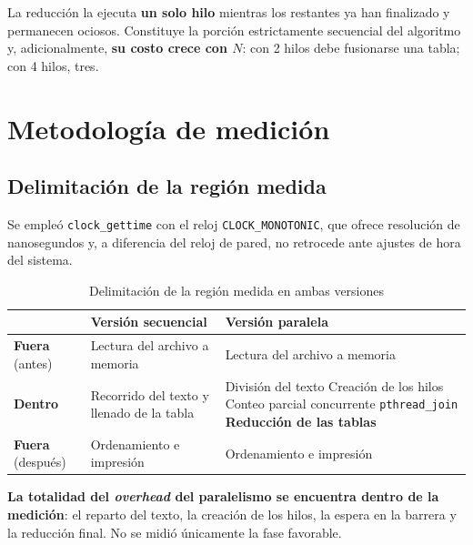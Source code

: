 \documentclass[11pt,letterpaper]{article}
\newcommand{\destacado}[2][azulcl]{%
  \begin{cajadest}[#1]\small #2\end{cajadest}}
\begin{document}
La reducción la ejecuta \textbf{un solo hilo} mientras los restantes ya han
finalizado y permanecen ociosos. Constituye la porción estrictamente secuencial
del algoritmo y, adicionalmente, \textbf{su costo crece con $N$}: con 2 hilos debe
fusionarse una tabla; con 4 hilos, tres.

\section{Metodología de medición}

\subsection{Delimitación de la región medida}
\label{sec:region}

Se empleó \texttt{clock\_gettime} con el reloj \texttt{CLOCK\_MONOTONIC}, que
ofrece resolución de nanosegundos y, a diferencia del reloj de pared, no
retrocede ante ajustes de hora del sistema.

\begin{table}[H]
\centering
\caption{Delimitación de la región medida en ambas versiones}
\small
\begin{tabular}{@{}p{3.2cm}p{5.3cm}p{5.8cm}@{}}
\toprule
 & \textbf{Versión secuencial} & \textbf{Versión paralela} \\
\midrule
\textbf{Fuera} (antes) & Lectura del archivo a memoria &
  Lectura del archivo a memoria \\
\addlinespace
\textbf{Dentro} & Recorrido del texto y llenado de la tabla &
  División del texto \newline
  Creación de los hilos \newline
  Conteo parcial concurrente \newline
  \texttt{pthread\_join} \newline
  \textbf{Reducción de las tablas} \\
\addlinespace
\textbf{Fuera} (después) & Ordenamiento e impresión &
  Ordenamiento e impresión \\
\bottomrule
\end{tabular}
\end{table}

\destacado{\textbf{La totalidad del \emph{overhead} del paralelismo se encuentra
dentro de la medición}: el reparto del texto, la creación de los hilos, la espera
en la barrera y la reducción final. No se midió únicamente la fase favorable.}
\end{document}
